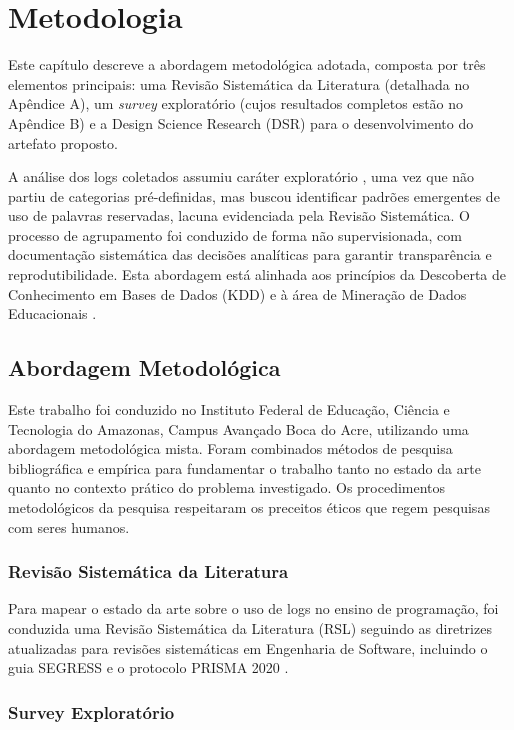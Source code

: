 \chapter{Metodologia}
\label{cap:metodologia}

Este capítulo descreve a abordagem metodológica adotada, composta por três elementos principais: uma Revisão Sistemática da Literatura (detalhada no Apêndice A), um \textit{survey} exploratório (cujos resultados completos estão no Apêndice B) e a Design Science Research (DSR) para o desenvolvimento do artefato proposto.

A análise dos logs coletados assumiu caráter exploratório \cite{gil2018metodos}, uma vez que não partiu de categorias pré-definidas, mas buscou identificar padrões emergentes de uso de palavras reservadas, lacuna evidenciada pela Revisão Sistemática. O processo de agrupamento foi conduzido de forma não supervisionada, com documentação sistemática das decisões analíticas para garantir transparência e reprodutibilidade. Esta abordagem está alinhada aos princípios da Descoberta de Conhecimento em Bases de Dados (KDD) \cite{fayyad1996knowledge} e à área de Mineração de Dados Educacionais \cite{baker2009state}.

\section{Abordagem Metodológica}

Este trabalho foi conduzido no Instituto Federal de Educação, Ciência e Tecnologia do Amazonas, Campus Avançado Boca do Acre, utilizando uma abordagem metodológica mista. Foram combinados métodos de pesquisa bibliográfica e empírica para fundamentar o trabalho tanto no estado da arte quanto no contexto prático do problema investigado. Os procedimentos metodológicos da pesquisa respeitaram os preceitos éticos que regem pesquisas com seres humanos.\subsection{Revisão Sistemática da Literatura}

Para mapear o estado da arte sobre o uso de logs no ensino de programação, foi conduzida uma Revisão Sistemática da Literatura (RSL) seguindo as diretrizes atualizadas para revisões sistemáticas em Engenharia de Software, incluindo o guia SEGRESS \cite{kitchenham2023segress} e o protocolo PRISMA 2020 \cite{page2021prisma}.

\subsection{Survey Exploratório}


